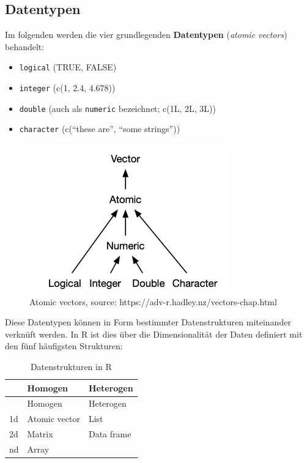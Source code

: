 \documentclass[
]{article}
\providecommand{\tightlist}{%
  \setlength{\itemsep}{0pt}\setlength{\parskip}{0pt}}
\begin{document}
\hypertarget{datentypen}{%
\subsection{Datentypen}\label{datentypen}}

Im folgenden werden die vier grundlegenden \textbf{Datentypen} (\emph{atomic vectors}) behandelt:

\begin{itemize}
\tightlist
\item
  \texttt{logical} (TRUE, FALSE)
\item
  \texttt{integer} (c(1, 2.4, 4.678))
\item
  \texttt{double} (auch als \texttt{numeric} bezeichnet; c(1L, 2L, 3L))
\item
  \texttt{character} (c(``these are'', ``some strings''))
\end{itemize}

\begin{figure}

{\centering \includegraphics[width=1\linewidth]{images/079} 

}

\caption{Atomic vectors, source: https://adv-r.hadley.nz/vectors-chap.html}\label{fig:unnamed-chunk-41}
\end{figure}

Diese Datentypen können in Form bestimmter Datenstrukturen miteinander verknüft werden. In R ist dies über die Dimensionalität der Daten definiert mit den fünf häufigsten Strukturen:

\begin{longtable}[]{@{}lll@{}}
\caption{Datenstrukturen in R}\tabularnewline
\toprule
& Homogen & Heterogen \\
\midrule
\endfirsthead
\toprule
& Homogen & Heterogen \\
\midrule
\endhead
1d & Atomic vector & List \\
2d & Matrix & Data frame \\
nd & Array & \\
\bottomrule
\end{longtable}
\end{document}
